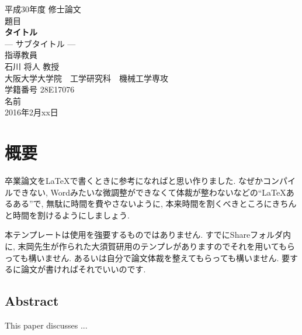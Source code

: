\begin{titlepage}
\centering
\vspace*{40truept}
{\Large 平成30年度 修士論文} \\ %
\vspace{40truept} 
 {\Large 題目} \\
 \vspace{10truept} 
{\LARGE \textbf{タイトル}}\\ %
\vspace{10truept}
{\Large --- サブタイトル ---}\\ %
\vspace{120truept}
{\Large 指導教員}\\ %
 \vspace{10truept} 
{\Large 石川 将人 教授}\\ %
\vspace{60truept}
{\Large 大阪大学大学院　工学研究科　機械工学専攻}\\ %
 \vspace{10truept} 
{\Large 学籍番号 28E17076}\\ %
\vspace{20truept}
{\LARGE 名前}\\ %
\vspace{80truept}
{\Large 2016年2月xx日} %
\end{titlepage}
\cleardoublepage
\chapter*{\huge 概要}
\Cvs

卒業論文を\LaTeX で書くときに参考になればと思い作りました. なぜかコンパイルできない, Wordみたいな微調整ができなくて体裁が整わないなどの``\LaTeX あるある''で, 無駄に時間を費やさないように, 本来時間を割くべきところにきちんと時間を割けるようにしましょう. 

本テンプレートは使用を強要するものではありません. すでにShareフォルダ内に, 末岡先生が作られた大須賀研用のテンプレがありますのでそれを用いてもらっても構いません. あるいは自分で論文体裁を整えてもらっても構いません. 要するに論文が書ければそれでいいのです. 





\section*{\huge Abstract}
\Cvs
This paper discusses ...
%
%


\newpage

\tableofcontents   %
\thispagestyle{plain}
\listoffigures %
\listoftables %

